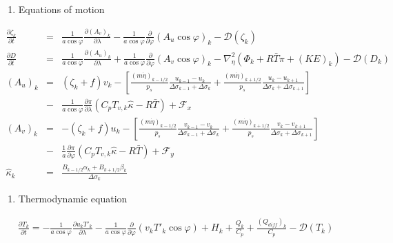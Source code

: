\begin{enumerate}
\def\labelenumi{\arabic{enumi}.}
\setcounter{enumi}{2}
\tightlist
\item
  Equations of motion
\end{enumerate}
\begin{eqnarray}
  \frac{\partial \zeta_k}{\partial t}
        &=&   \frac{1}{a\cos\varphi}
            \frac{\partial (A_v)_k}{\partial \lambda}
          - \frac{1}{a\cos\varphi}
            \frac{\partial }{\partial \varphi} (A_u \cos\varphi)_k
          - {\mathcal D}(\zeta_k) \\
  \frac{\partial D}{\partial t}
        &=&   \frac{1}{a\cos\varphi}
            \frac{\partial (A_u)_k}{\partial \lambda}
          + \frac{1}{a\cos\varphi}
            \frac{\partial }{\partial \varphi} (A_v \cos\varphi)_k
          - \nabla^{2}_{\eta}
           ( \Phi_k + R\bar{T} \pi
             + ({\mathit KE})_k )
          - {\mathcal D}(D_k) \\
  (A_u)_k
    &=&  ( \zeta_k + f ) v_k
             - \left[ \frac{(m\dot{\eta})_{k-1/2}}{p_s} \frac{u_{k-1} - u_k}{\Delta\sigma_{k-1}+\Delta\sigma_k}
               + \frac{(m\dot{\eta})_{k+1/2}}{p_s} \frac{u_k   - u_{k+1}}{\Delta\sigma_{k}+\Delta\sigma_{k+1}} \right] \\
           &-& \frac{1}{a\cos\varphi} \frac{\partial \pi}{\partial \lambda}(C_p T_{v,k}\hat{\kappa}-R\bar{T})
             + {\mathcal F}_x \\
  (A_v)_k
    &=&  - ( \zeta_k + f ) u_k
             - \left[ \frac{(m\dot{\eta})_{k-1/2}}{p_s} \frac{v_{k-1} - v_k}{\Delta\sigma_{k-1}+\Delta\sigma_k}
               + \frac{(m\dot{\eta})_{k+1/2}}{p_s} \frac{v_k   - v_{k+1}}{\Delta\sigma_{k}+\Delta\sigma_{k+1}} \right] \\
           &-& \frac{1}{a} \frac{\partial \pi}{\partial \varphi}(C_p T_{v,k}\hat{\kappa}-R\bar{T})
             + {\mathcal F}_y \\
   \hat{\kappa}_k
    &=& \frac{ B_{k-1/2} \alpha_k + B_{k+1/2} \beta_k }
            { \Delta\sigma_k                                  }
\end{eqnarray}

\begin{enumerate}
\def\labelenumi{\arabic{enumi}.}
\setcounter{enumi}{3}
\tightlist
\item
  Thermodynamic equation
\end{enumerate}
\begin{eqnarray}
  \frac{\partial T_k}{\partial t}
     =  - \frac{1}{a\cos\varphi}
               \frac{\partial u_k T'_k}{\partial \lambda}
          - \frac{1}{a\cos\varphi}
               \frac{\partial }{\partial \varphi} (v_k T'_k \cos\varphi)
          + H_k
        + \frac{Q_k}{C_{p}}
          + \frac{(Q_{diff})_k}{C_p}
          - {\mathcal D}(T_k)
\end{eqnarray}

